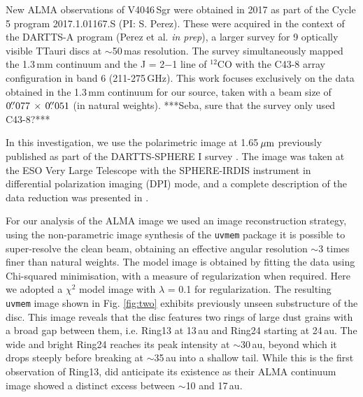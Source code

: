 \documentclass[letters,usenatbib,times]{mnras}
\begin{document}

New ALMA observations of V4046\,Sgr were obtained in 2017 as part of the Cycle 5 program 2017.1.01167.S (PI: S. Perez). These were acquired in the context of the DARTTS-A program (Perez et al. {\em in prep}), a larger survey for 9 optically visible TTauri discs at $\sim$50\,mas resolution. The survey simultaneously mapped the 1.3\,mm continuum and the J = 2$-$1 line of $^{12}$CO with the C43-8 array configuration in band 6 (211-275\,GHz). This work focuses exclusively on the data obtained in the 1.3\,mm continuum for our source, taken with a beam size of $0\hbox{$.\!\!^{\prime\prime}$}077 \,\times \, 0\hbox{$.\!\!^{\prime\prime}$}051$ (in natural weights). ***Seba, sure that the survey only used C43-8?***

In this investigation, we use the polarimetric image at 1.65\,$\hbox{$\mu$m}$ previously published as part of the DARTTS-SPHERE I survey \citep{Avenhaus_2018}. The image was taken at the ESO Very Large Telescope with the SPHERE-IRDIS instrument in differential polarization imaging (DPI) mode, and a complete description of the data reduction was presented in \citet{Avenhaus_2018}. 

For our analysis of the ALMA image we used an image reconstruction strategy, using the non-parametric image synthesis of the {\tt uvmem} package \citep{2006ApJ...639..951C, 2018A&C....22...16C} it is possible to super-resolve the clean beam, obtaining an effective angular resolution $\sim$3 times finer than natural weights. The model image is obtained by fitting the data using Chi-squared minimisation, with a measure of regularization when required. Here we adopted a $\chi^2$ model image with $\lambda$ = 0.1 for regularization. The resulting {\tt uvmem} image shown in Fig. \ref{fig:two} exhibits previously unseen substructure of the disc. This image reveals that the disc features two rings of large dust grains with a broad gap between them, i.e. Ring13 at 13\,au and Ring24 starting at 24\,au. The wide and bright Ring24 reaches its peak intensity at $\sim$30\,au, beyond which it drops steeply before breaking at $\sim$35\,au into a shallow tail. While this is the first observation of Ring13, \citet{Ru_z_Rodr_guez_2019} did anticipate its existence as their ALMA continuum image showed a distinct excess between
$\sim$10 and 17\,au.
\end{document}
